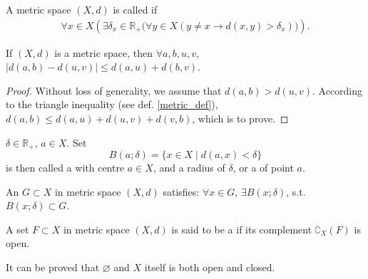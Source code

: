 \documentclass[openany]{book}
\begin{document}
A metric space $(X,d)$ is called  if 
\begin{align*}
	\forall x\in X\left(
		\exists \delta_x\in \mathbb{R}_+ \big(
			\forall y \in X(
				y\neq x\to d(x,y)>\delta_x)\big)\right) .
\end{align*}

\begin{lemma}\label{quadruple_inequality}
If $(X,d)$ is a metric space, then $\forall a,b,u,v $, $\left| d(a,b) - d(u,v) \right| \leq d(a,u)+d(b,v) $.
\end{lemma}
\begin{proof}
	Without loss of generality, we assume that $d(a,b) > d(u,v)$. According to the triangle inequality (see def. \ref{metric_def}), $d(a,b) \leq d(a,u)+d(u,v)+d(v,b)$, which is to prove.  
\end{proof}

\begin{definition}\label{delta_ball}
$\delta\in\mathbb{R}_+$, $a\in X$. Set
\[
	B(a;\delta)=\{x\in X \mid d(a,x)<\delta\}
\]
is then called a  with centre $a\in X$, and a radius of $\delta$, or a  of point $a$.
\end{definition}

\begin{definition}\label{open_set_metric}
An  $G\subset X$ in metric space $(X,d)$ satisfies: $\forall x\in G$, $\exists B(x;\delta)$, s.t. $B(x;\delta)\subset G$.
\end{definition}

\begin{definition}\label{closed_set_metric}
A set $F\subset X$ in metric space $(X,d)$ is said to be a  if its complement $\complement_X(F)$ is open.
\end{definition}

It can be proved that $\varnothing$ and $X$ itself is both open and closed.
\end{document}
